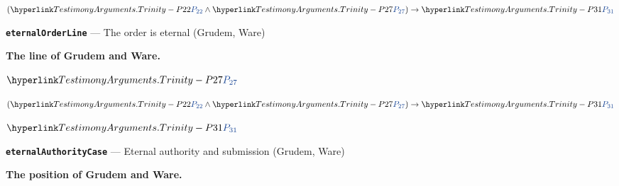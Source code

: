 \documentclass[11pt,paper=\testimonypaper,DIV=13,parskip=false]{scrartcl}
\begin{document}
\begin{derivation}
  \item[] \((\pvar{TestimonyArguments.Trinity}{22} \land \pvar{TestimonyArguments.Trinity}{27}) \rightarrow \pvar{TestimonyArguments.Trinity}{31}\)
\end{derivation}
\par\medskip\noindent\textbf{\texttt{eternal\allowbreak{}Order\allowbreak{}Line}} --- The order is eternal (Grudem, Ware)\par\nobreak\noindent
\textbf{The line of Grudem and Ware.}

\begin{derivation}
  \item[(1)] \(\pvar{TestimonyArguments.Trinity}{27}\)
  \item[(2)] \((\pvar{TestimonyArguments.Trinity}{22} \land \pvar{TestimonyArguments.Trinity}{27}) \rightarrow \pvar{TestimonyArguments.Trinity}{31}\)
  \item[\(\vdash\)] \(\pvar{TestimonyArguments.Trinity}{31}\)
\end{derivation}
\par\medskip\noindent\textbf{\texttt{eternal\allowbreak{}Authority\allowbreak{}Case}} --- Eternal authority and submission (Grudem, Ware)\par\nobreak\noindent
\textbf{The position of Grudem and Ware.}
\end{document}

